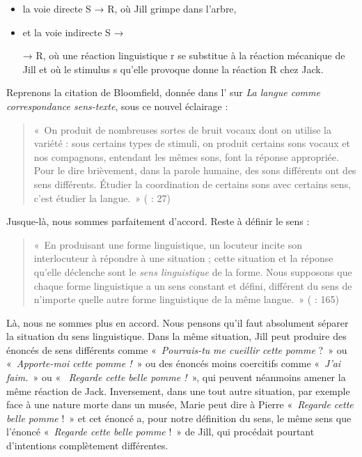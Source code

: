 \begin{itemize}
\item 
la voie directe S → R, où Jill grimpe dans l’arbre,
\item 
et la voie indirecte S →  → R, où une réaction linguistique r se substitue à la réaction mécanique de Jill et où le stimulus s qu’elle provoque donne la réaction R chez Jack.
\end{itemize}

Reprenons la citation de Bloomfield, donnée dans l’ sur \textit{La langue comme correspondance sens-texte}, sous ce nouvel éclairage :

\begin{quote}
    «~On produit de nombreuses sortes de bruit vocaux dont on utilise la variété : sous certains types de stimuli, on produit certains sons vocaux et nos compagnons, entendant les mêmes sons, font la réponse appropriée. Pour le dire brièvement, dans la parole humaine, des sons différents ont des sens différents. Étudier la coordination de certains sons avec certains sens, c’est étudier la langue.~» (\citealt{bloomfield1933language} : 27)
\end{quote}

Jusque-là, nous sommes parfaitement d’accord. Reste à définir le sens :

\begin{quote}
    «~En produisant une forme linguistique, un locuteur incite son interlocuteur à répondre à une situation ; cette situation et la réponse qu’elle déclenche sont le \textit{sens linguistique} de la forme. Nous supposons que chaque forme linguistique a un sens constant et défini, différent du sens de n’importe quelle autre forme linguistique de la même langue.~» (\citealt{bloomfield1933language} : 165)
\end{quote}

Là, nous ne sommes plus en accord. Nous pensons qu’il faut absolument séparer la situation du sens linguistique. Dans la même situation, Jill peut produire des énoncés de sens différents comme «~\textit{Pourrais-tu} \textit{me cueillir cette pomme} ?~» ou «~\textit{Apporte-moi cette pomme !~}» ou des énoncés moins coercitifs comme «~\textit{J’ai faim.}~» ou «~ \textit{Regarde cette belle pomme !~}», qui peuvent néanmoins amener la même réaction de Jack. Inversement, dans une tout autre situation, par exemple face à une nature morte dans un musée, Marie peut dire à Pierre «~\textit{Regarde cette belle pomme} !~» et cet énoncé a, pour notre définition du sens, le même sens que l’énoncé «~\textit{Regarde cette belle pomme} !~» de Jill, qui procédait pourtant d’intentions complètement différentes.

